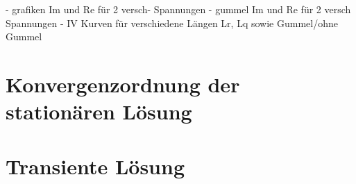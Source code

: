 - grafiken Im und Re für 2 versch- Spannungen
- gummel Im und Re für 2 versch Spannungen
- IV Kurven für verschiedene Längen Lr, Lq sowie Gummel/ohne Gummel

\section{Konvergenzordnung der stationären Lösung}\label{sec:rates}


\section{Transiente Lösung}\label{sec:transient}
